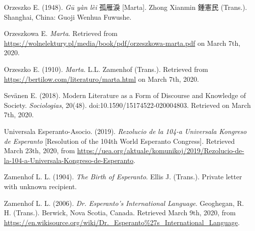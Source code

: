 Orzeszko E. (1948). \textit{Gū yàn lèi} 孤雁淚 [Marta]. Zhong Xianmin 鍾憲民 (Trans.). Shanghai, China: Guoji Wenhua Fuwushe.

Orzeszkowa E. \textit{Marta}. Retrieved from \url{https://wolnelektury.pl/media/book/pdf/orzeszkowa-marta.pdf} on March 7th, 2020.

Orzeszko E. (1910). \textit{Marta}. L.L. Zamenhof (Trans.). Retrieved from \url{https://bertilow.com/literaturo/marta.html} on March 7th, 2020.

Sevänen E. (2018). Modern Literature as a Form of Discourse and Knowledge of Society. \textit{Sociologias}, 20(48). doi:10.1590/15174522-020004803. Retrieved on March 7th, 2020.

Universala Esperanto-Asocio. (2019). \textit{Rezolucio de la 104-a Universala Kongreso de Esperanto} [Resolution of the 104th World Esperanto Congress]. Retrieved March 23th, 2020, from \url{https://uea.org/aktuale/komunikoj/2019/Rezolucio-de-la-104-a-Universala-Kongreso-de-Esperanto}.

Zamenhof L. L. (1904). \textit{The Birth of Esperanto}. Ellis J. (Trans.). Private letter with unknown recipient.

Zamenhof L. L. (2006). \textit{Dr. Esperanto's International Language}. Geoghegan, R. H. (Trans.). Berwick, Nova Scotia, Canada. Retrieved March 9th, 2020, from \url{https://en.wikisource.org/wiki/Dr._Esperanto\%27s_International_Language}.